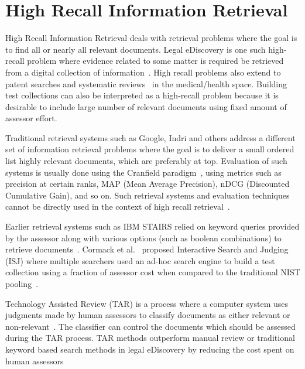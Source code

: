 \label{chap:rel}


\section{High Recall Information Retrieval}

High Recall Information Retrieval deals with retrieval problems where the goal
is to find all or nearly all relevant documents. Legal eDiscovery is one such
high-recall problem where evidence related to some matter is required be retrieved
from a digital collection of
information~\cite{oard2013information,oard2010evaluation}. High recall problems
also extend to patent searches and systematic reviews~\cite{yu2016read} in the
medical/health
space. Building test collections can also be interpreted as a high-recall
problem because it is desirable to include large number of relevant documents
using fixed amount of assessor effort.

Traditional retrieval systems such as Google, Indri and others address a
different set of information retrieval problems where the goal is to deliver a
small ordered list highly relevant documents, which are preferably at top.
Evaluation of such systems is usually done using the Cranfield
paradigm~\cite{voorhees2001philosophy}, using metrics such as precision at
certain ranks, MAP (Mean Average Precision), nDCG (Discounted Cumulative Gain),
and so on. Such retrieval systems and evaluation techniques cannot be directly
used in the context of high recall retrieval~\cite{roegiest2017design}.

Earlier retrieval systems such as IBM STAIRS relied on keyword queries provided
by the assessor along with various options (such as boolean combinations) to
retrieve documents~\cite{blair1985evaluation}. Cormack et
al.~\cite{cormack1998efficient} proposed Interactive Search and Judging (ISJ)
where multiple searchers used an ad-hoc search engine to build a test
collection using a fraction of assessor cost when compared to the traditional
NIST pooling~\cite{harman1993overview}.

Technology Assisted Review (TAR) is a process where a computer system uses
judgments made by human assessors to classify documents as either relevant or
non-relevant~\cite{grossman2014grossman}. The classifier can control the
documents which should be assessed during the TAR process. TAR methods
outperform manual review or traditional keyword based search methods in legal
eDiscovery by reducing the cost spent on human
assessors~\cite{grossman2010technology,roitblat2010document}

